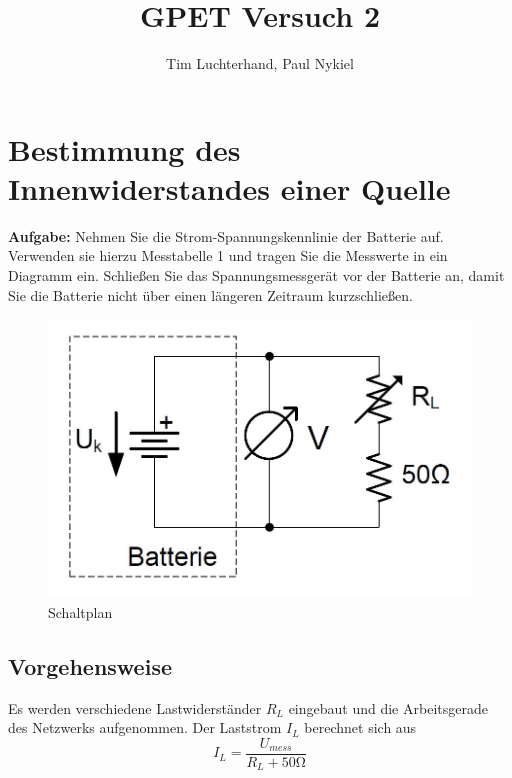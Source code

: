 \documentclass[10pt]{report}
\author{Tim Luchterhand, Paul Nykiel}
\title{GPET Versuch 2}
\begin{document}
        \maketitle

        \section{Bestimmung des Innenwiderstandes einer Quelle}
        \textbf{Aufgabe:} Nehmen Sie die Strom-Spannungskennlinie der Batterie auf. Verwenden sie hierzu Messtabelle
        1 und tragen Sie die Messwerte in ein Diagramm ein. Schließen Sie das Spannungsmessgerät
        vor der Batterie an, damit Sie die Batterie nicht über einen längeren
        Zeitraum kurzschließen.

        \begin{center}
            \begin{figure}[H]
                \includegraphics[width=\textwidth]{BatterieSchaltung.JPG}
              \caption{Schaltplan}
            \end{figure}
        \end{center}

        \subsection{Vorgehensweise}
        Es werden verschiedene Lastwiderständer $R_L$ eingebaut und die Arbeitsgerade
        des Netzwerks aufgenommen. Der Laststrom $I_L$ berechnet sich aus
        \begin{equation*}
            I_L = \frac{U_{mess}}{R_L + 50\si{\ohm}}
        \end{equation*}
\end{document}
